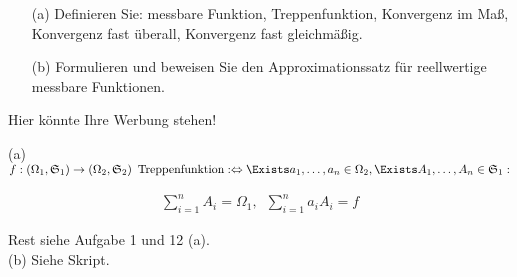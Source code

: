 \begin{exercise}

\begin{itemize}
  \item[(a)] Definieren Sie: messbare Funktion, Treppenfunktion, Konvergenz im Maß, Konvergenz fast überall, Konvergenz fast gleichmäßig.
  \item[(b)] Formulieren und beweisen Sie den Approximationssatz für reellwertige messbare Funktionen.
\end{itemize}

\end{exercise}


\begin{solution}

Hier könnte Ihre Werbung stehen!

(a) $f: (\Omega_1, \mathfrak{S}_1) \to (\Omega_2, \mathfrak{S}_2) \enspace \text{Treppenfunktion}
: \Leftrightarrow
\Exists a_1, \ldots, a_n \in \Omega_2,
\Exists A_1, \ldots, A_n \in \mathfrak{S}_1:$

\begin{align*}
  \sum_{i=1}^n A_i = \Omega_1, \enspace
  \sum_{i=1}^n a_i A_i = f
\end{align*}

Rest siehe Aufgabe 1 und 12 (a). \\

(b) Siehe Skript.

\end{solution}
